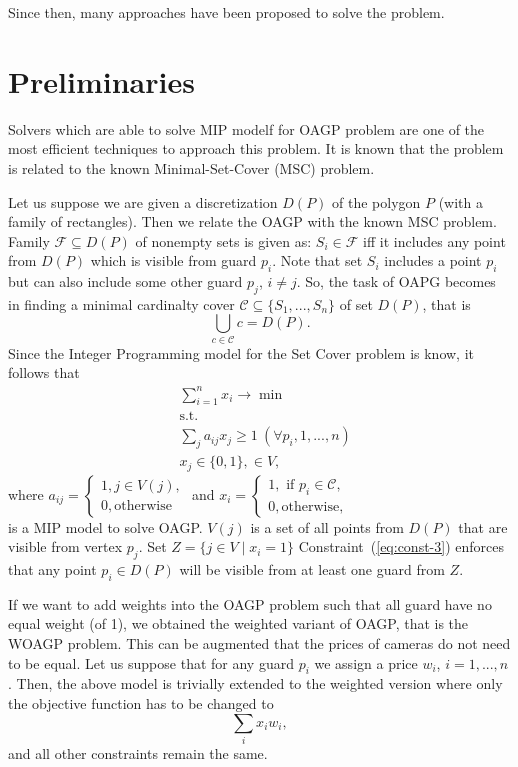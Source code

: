 \documentclass[runningheads,a4paper]{llncs}
\begin{document}
     Since then, many approaches have been proposed to solve the problem.
     \section{Preliminaries}
     Solvers which are able to solve MIP modelf for OAGP problem are one of the most efficient techniques to approach this problem. It is known that the problem is related to the known Minimal-Set-Cover (MSC) problem. 

     Let us suppose we are given a discretization $D(P)$ of the polygon $P$ (with a family of rectangles). Then we relate the OAGP with the known MSC problem.  
     Family $\mathcal{F}\subseteq D(P)$ of nonempty sets is given as: $S_i \in \mathcal{F}$ iff it includes any point from $D(P)$ which is visible from guard $p_i$. Note that set $S_i$ includes a point $p_i$ but can also include some other guard $p_j$, $i \neq j$. So, the task of OAPG becomes in finding a minimal cardinalty cover $\mathcal{C}\subseteq\{S_1,...,S_n\}$ of set $D(P)$, that is 
     $$ \bigcup_{c \in \mathcal{C}} c = D(P).$$ Since the Integer Programming model for the Set Cover problem is know, it follows that 
     \begin{align}
        &\sum_{i=1}^n x_i \longrightarrow \min \\
        &\mbox{s.t.} \\
        &\sum_{j} a_{ij}x_j \geq 1\ (\forall p_i,1,...,n) \label{eq:const-3}\\
        & x_j \in \{0,1\},  \in V,
     \end{align}
     where 
     $a_{ij} = \begin{cases}
          1, j \in V(j), \\
          0, \mbox{otherwise} 
     \end{cases}$ 
     and $x_i = \begin{cases}
     	 1, \mbox{ if } p_i \in \mathcal{C},\\
     	 0, \mbox{otherwise},
     \end{cases}$ \\
      is a MIP model to solve OAGP. 
     $V(j)$ is a set of all points from $D(P)$ that are visible from vertex $p_j$. Set $Z = \{j \in V\mid x_i=1\}$
     Constraint~(\ref{eq:const-3}) enforces that any point $p_i \in D(P)$ will be visible from at least one guard from $Z$.
     
     If we want to add weights into the OAGP problem such that all guard have no equal weight (of 1), we obtained the weighted variant of OAGP, that is the WOAGP problem. This can be augmented that the prices of cameras do not need to be equal.  Let us suppose that for any guard $p_i$ we assign a price $w_i$, $i=1,...,n$. Then, the above model is trivially extended to the weighted version where only the objective function has to be changed to
     $$ \sum_{i} x_i w_i,$$
      and all other constraints remain the same.
\end{document}
